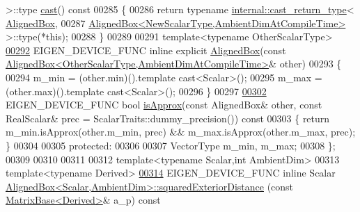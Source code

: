 \begin{DoxyCode}
       >::type \hyperlink{group___geometry___module_a269eb719d3e093d9c1cb4309b815c51b}{cast}()\textcolor{keyword}{ const}
00285 \textcolor{keyword}{  }\{
00286     \textcolor{keywordflow}{return} \textcolor{keyword}{typename} \hyperlink{struct_eigen_1_1internal_1_1cast__return__type}{internal::cast\_return\_type}<
      \hyperlink{group___geometry___module_aeb7682d3d8676752e9b789b51d950872}{AlignedBox},
00287                     \hyperlink{group___geometry___module_class_eigen_1_1_aligned_box}{AlignedBox<NewScalarType,AmbientDimAtCompileTime>}
       >::type(*\textcolor{keyword}{this});
00288   \}
00289 
00291   \textcolor{keyword}{template}<\textcolor{keyword}{typename} OtherScalarType>
\hyperlink{group___geometry___module_afa9f0963fda762e5ca3633caec7bf8f2}{00292}   EIGEN\_DEVICE\_FUNC \textcolor{keyword}{inline} \textcolor{keyword}{explicit} \hyperlink{group___geometry___module_afa9f0963fda762e5ca3633caec7bf8f2}{AlignedBox}(\textcolor{keyword}{const} 
      \hyperlink{group___geometry___module_class_eigen_1_1_aligned_box}{AlignedBox<OtherScalarType,AmbientDimAtCompileTime>}& 
      other)
00293   \{
00294     m\_min = (other.min)().template cast<Scalar>();
00295     m\_max = (other.max)().template cast<Scalar>();
00296   \}
00297 
\hyperlink{group___geometry___module_a9d21b1102d3b6944a80a563d3974c83c}{00302}   EIGEN\_DEVICE\_FUNC \textcolor{keywordtype}{bool} \hyperlink{group___geometry___module_a9d21b1102d3b6944a80a563d3974c83c}{isApprox}(\textcolor{keyword}{const} AlignedBox& other, \textcolor{keyword}{const} RealScalar& prec = 
      ScalarTraits::dummy\_precision())\textcolor{keyword}{ const}
00303 \textcolor{keyword}{  }\{ \textcolor{keywordflow}{return} m\_min.isApprox(other.m\_min, prec) && m\_max.isApprox(other.m\_max, prec); \}
00304 
00305 \textcolor{keyword}{protected}:
00306 
00307   VectorType m\_min, m\_max;
00308 \};
00309 
00310 
00311 
00312 \textcolor{keyword}{template}<\textcolor{keyword}{typename} Scalar,\textcolor{keywordtype}{int} AmbientDim>
00313 \textcolor{keyword}{template}<\textcolor{keyword}{typename} Derived>
\hyperlink{group___geometry___module_aa6d9ffc81bd77da631fef6559f45cf13}{00314} EIGEN\_DEVICE\_FUNC \textcolor{keyword}{inline} Scalar 
      \hyperlink{group___geometry___module_aa6d9ffc81bd77da631fef6559f45cf13}{AlignedBox<Scalar,AmbientDim>::squaredExteriorDistance}
      (\textcolor{keyword}{const} \hyperlink{group___core___module_class_eigen_1_1_matrix_base}{MatrixBase<Derived>}& a\_p)\textcolor{keyword}{ const}

\end{DoxyCode}
